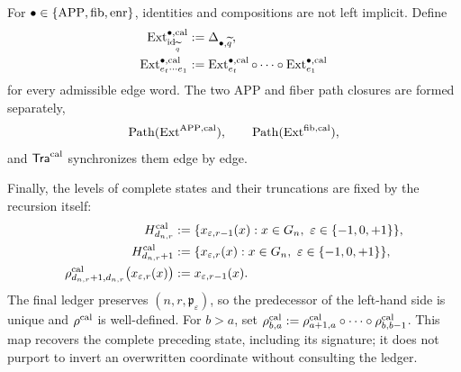 For \(\bullet\in\{\mathrm{APP},{\rm fib},{\rm enr}\}\), identities and compositions
are not left implicit. Define
\begin{align}
 \operatorname{Ext}^{\bullet,\rm cal}_{\operatorname{id}_{\widetilde q}}
   &:=\Delta_{\bullet,\widetilde q},\\
 \operatorname{Ext}^{\bullet,\rm cal}_{e_t\cdots e_1}
   &:=\operatorname{Ext}^{\bullet,\rm cal}_{e_t}\circ\cdots\circ
      \operatorname{Ext}^{\bullet,\rm cal}_{e_1}
 \label{hmtfg:eq:ext-palabra-calibrada-ch}
\end{align}
for every admissible edge word. The two APP and fiber path closures are formed
separately,
\begin{equation}
 \operatorname{Path}(\operatorname{Ext}^{\mathrm{APP},\rm cal}),\qquad
 \operatorname{Path}(\operatorname{Ext}^{\rm fib,cal}),
 \label{hmtfg:eq:dos-clausuras-ext-ch}
\end{equation}
and \(\mathsf{Tra}^{\rm cal}\) synchronizes them edge by edge.

Finally, the levels of complete states and their truncations are fixed by the
recursion itself:
\begin{align}
 H^{\rm cal}_{d_{n,r}}
   &:=\{x_{\varepsilon,r-1}(x):
          x\in G_n,\ \varepsilon\in\{-1,0,+1\}\},\\
 H^{\rm cal}_{d_{n,r}+1}
   &:=\{x_{\varepsilon,r}(x):
          x\in G_n,\ \varepsilon\in\{-1,0,+1\}\},\\
 \rho^{\rm cal}_{d_{n,r}+1,d_{n,r}}
   \bigl(x_{\varepsilon,r}(x)\bigr)
   &:=x_{\varepsilon,r-1}(x).
 \label{hmtfg:eq:truncamiento-calibrado-definido-ch}
\end{align}
The final ledger preserves \((n,r,\mathfrak p_\varepsilon)\), so the
predecessor of the left-hand side is unique and \(\rho^{\rm cal}\) is
well-defined. For \(b>a\), set
\(\rho^{\rm cal}_{b,a}:=\rho^{\rm cal}_{a+1,a}\circ\cdots\circ
\rho^{\rm cal}_{b,b-1}\). This map recovers the complete preceding state,
including its signature; it does not purport to invert an overwritten
coordinate without consulting the ledger.

